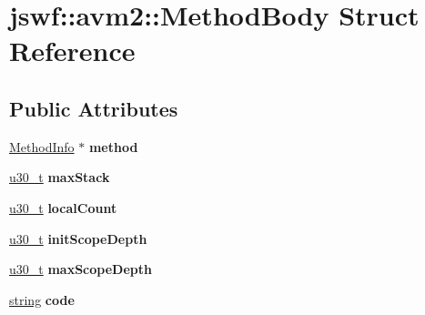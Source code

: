 \hypertarget{structjswf_1_1avm2_1_1_method_body}{\section{jswf\+:\+:avm2\+:\+:Method\+Body Struct Reference}
\label{structjswf_1_1avm2_1_1_method_body}
}
\subsection*{Public Attributes}
\begin{DoxyCompactItemize}
\item 
\hypertarget{structjswf_1_1avm2_1_1_method_body_a910d1f7ef990dc830fc1b91416e13596}{\hyperlink{structjswf_1_1avm2_1_1_method_info}{Method\+Info} $\ast$ {\bfseries method}}\label{structjswf_1_1avm2_1_1_method_body_a910d1f7ef990dc830fc1b91416e13596}

\item 
\hypertarget{structjswf_1_1avm2_1_1_method_body_a94d21bb9993138bfd197c2b6e74af4ac}{\hyperlink{namespacejswf_aa10d9ddca2a6a5debdc261dfae3d1117}{u30\+\_\+t} {\bfseries max\+Stack}}\label{structjswf_1_1avm2_1_1_method_body_a94d21bb9993138bfd197c2b6e74af4ac}

\item 
\hypertarget{structjswf_1_1avm2_1_1_method_body_ae0689c37a9c87bd4fb6054781e524384}{\hyperlink{namespacejswf_aa10d9ddca2a6a5debdc261dfae3d1117}{u30\+\_\+t} {\bfseries local\+Count}}\label{structjswf_1_1avm2_1_1_method_body_ae0689c37a9c87bd4fb6054781e524384}

\item 
\hypertarget{structjswf_1_1avm2_1_1_method_body_aa5589f5ddd2873563fa7b50a5ce71ab0}{\hyperlink{namespacejswf_aa10d9ddca2a6a5debdc261dfae3d1117}{u30\+\_\+t} {\bfseries init\+Scope\+Depth}}\label{structjswf_1_1avm2_1_1_method_body_aa5589f5ddd2873563fa7b50a5ce71ab0}

\item 
\hypertarget{structjswf_1_1avm2_1_1_method_body_a3ab78ba183a94a5fea22bbfebb78d0f7}{\hyperlink{namespacejswf_aa10d9ddca2a6a5debdc261dfae3d1117}{u30\+\_\+t} {\bfseries max\+Scope\+Depth}}\label{structjswf_1_1avm2_1_1_method_body_a3ab78ba183a94a5fea22bbfebb78d0f7}

\item 
\hypertarget{structjswf_1_1avm2_1_1_method_body_a61b6d8ef01100debc05786be059d8f21}{\hyperlink{namespacejswf_a755127d61081aa8af105eb800aa2c1ec}{string} {\bfseries code}}\label{structjswf_1_1avm2_1_1_method_body_a61b6d8ef01100debc05786be059d8f21}


\end{DoxyCompactItemize}
